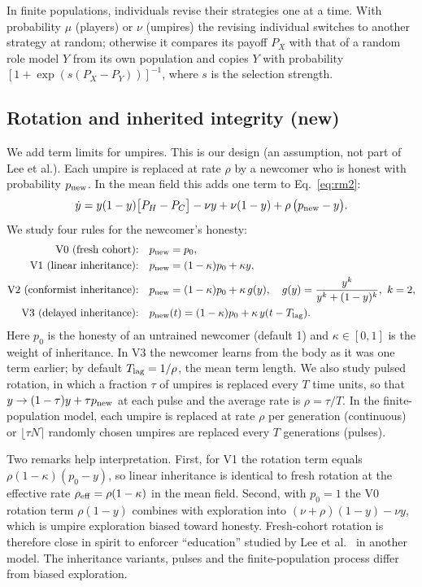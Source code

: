 \documentclass[11pt]{article}
\begin{document}
In finite populations, individuals revise their strategies one at a time. With probability $\mu$
(players) or $\nu$ (umpires) the revising individual switches to another strategy at random;
otherwise it compares its payoff $P_X$ with that of a random role model $Y$ from its own
population and copies $Y$ with probability $[1+\exp(s(P_X-P_Y))]^{-1}$, where $s$ is the
selection strength.

\subsection{Rotation and inherited integrity (new)}\label{sec:rotation}

We add term limits for umpires. This is our design (an assumption, not part of Lee et al.).
Each umpire is replaced at rate $\rho$ by a newcomer who is honest with probability $p_{\rm new}$.
In the mean field this adds one term to Eq.~\eqref{eq:rm2}:
\begin{equation}
\dot y = y(1-y)\big[P_H-P_C\big] - \nu y + \nu(1-y) + \rho\,\big(p_{\rm new}-y\big).\label{eq:rot}
\end{equation}
We study four rules for the newcomer's honesty:
\begin{align*}
\text{V0 (fresh cohort):}\quad & p_{\rm new}=p_0,\\
\text{V1 (linear inheritance):}\quad & p_{\rm new}=(1-\kappa)p_0+\kappa y,\\
\text{V2 (conformist inheritance):}\quad & p_{\rm new}=(1-\kappa)p_0+\kappa\, g(y),\quad g(y)=\frac{y^k}{y^k+(1-y)^k},\ k=2,\\
\text{V3 (delayed inheritance):}\quad & p_{\rm new}(t)=(1-\kappa)p_0+\kappa\, y(t-T_{\rm lag}).
\end{align*}
Here $p_0$ is the honesty of an untrained newcomer (default 1) and $\kappa\in[0,1]$ is the weight
of inheritance. In V3 the newcomer learns from the body as it was one term earlier; by default
$T_{\rm lag}=1/\rho$, the mean term length. We also study pulsed rotation, in which a fraction
$\tau$ of umpires is replaced every $T$ time units, so that $y\to(1-\tau)y+\tau p_{\rm new}$ at
each pulse and the average rate is $\rho=\tau/T$. In the finite-population model, each umpire is
replaced at rate $\rho$ per generation (continuous) or $\lfloor\tau N\rceil$ randomly chosen
umpires are replaced every $T$ generations (pulses).

Two remarks help interpretation. First, for V1 the rotation term equals
$\rho(1-\kappa)(p_0-y)$, so linear inheritance is identical to fresh rotation at the effective rate
$\rho_{\rm eff}=\rho(1-\kappa)$ in the mean field. Second, with $p_0=1$ the V0 rotation term
$\rho(1-y)$ combines with exploration into $(\nu+\rho)(1-y)-\nu y$, which is umpire exploration
biased toward honesty. Fresh-cohort rotation is therefore close in spirit to enforcer
``education'' studied by Lee et al.~\cite{lee2015logging} in another model. The inheritance
variants, pulses and the finite-population process differ from biased exploration.
\end{document}
